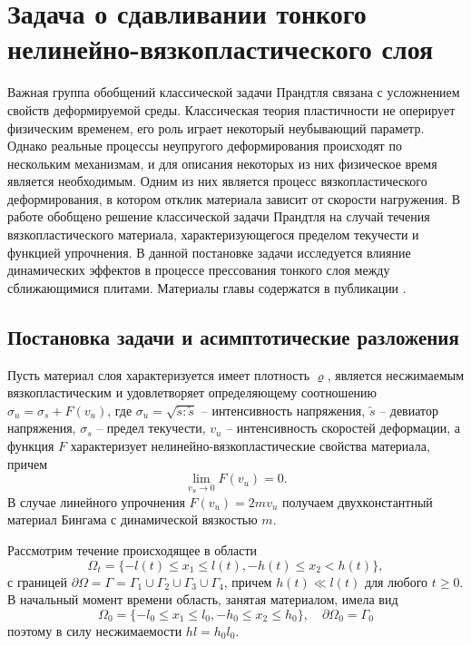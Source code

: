 \chapter{Задача о сдавливании тонкого нелинейно-вязкопластического слоя}\label{ch:ch4}
Важная группа обобщений классической задачи Прандтля \autocite{Prandtl:1948} связана с усложнением свойств деформируемой среды. Классическая теория пластичности не оперирует физическим временем, его роль играет некоторый неубывающий параметр. Однако реальные процессы неупругого деформирования происходят по нескольким механизмам, и для описания некоторых из них физическое время является необходимым. Одним из них является процесс вязкопластического деформирования, в котором отклик материала зависит от скорости нагружения. В работе \autocites{Georgievsky:2012} обобщено решение классической задачи Прандтля на случай течения вязкопластического материала, характеризующегося пределом текучести и функцией упрочнения. В данной постановке задачи исследуется влияние динамических эффектов в процессе прессования тонкого слоя между сближающимися плитами. Материалы главы содержатся в публикации .

\section{Постановка задачи и асимптотические разложения}\label{sec:ch4/sec1}

Пусть материал слоя характеризуется имеет плотность $\varrho$, является несжимаемым вязкопластическим и удовлетворяет определяющему соотношению  $\sigma_{u} = \sigma_{s} + F(v_{u})$, где $\sigma_{u} = \sqrt{\utilde{s} : \utilde{s}}$ -- интенсивность напряжения, $\utilde{s}$ -- девиатор напряжения, $\sigma_{s}$ -- предел текучести, $v_{u}$ -- интенсивность скоростей деформации, а функция $F$ характеризует нелинейно-вязкопластические свойства материала, причем
\begin{equation}
  \lim_{v_{u}\rightarrow 0}F(v_{u}) = 0.
\end{equation}
В случае линейного упрочнения $F(v_{u}) = 2 m v_{u}$ получаем двухконстантный материал Бингама с динамической вязкостью $m$.

Рассмотрим течение происходящее в области
\begin{equation}
  \Omega_{t} = \{-l(t) \le x_{1} \le l(t), -h(t) \le x_{2} < h(t)\},
\end{equation}
с границей $\partial\Omega = \Gamma = \Gamma_{1} \cup \Gamma_{2} \cup \Gamma_{3} \cup \Gamma_{4}$, причем $h(t) \ll l(t)$ для любого $t \ge 0$.
В начальный момент времени область, занятая материалом, имела вид
\begin{equation}
  \Omega_{0} = \{-l_{0} \le x_{1} \le l_{0}, -h_{0} \le x_{2} \le h_{0}\}, \quad \partial\Omega_{0} = \Gamma_{0}
\end{equation}
поэтому в силу несжимаемости $h l=h_{0} l_{0}$.

